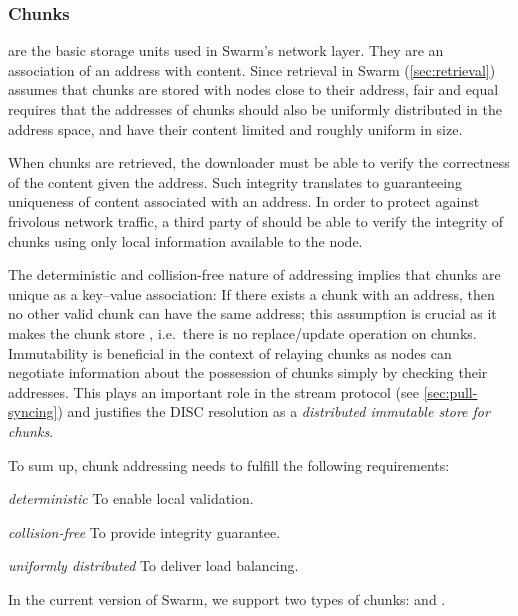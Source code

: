 \subsubsection{Chunks}\label{sec:chunks}

 are the basic storage units used in Swarm's network layer. They are an association of an address with content. Since retrieval in Swarm (\ref{sec:retrieval}) assumes that chunks are stored with nodes close to their address, fair and equal  requires that the addresses of chunks should also be uniformly distributed in the address space, and have their content limited and roughly uniform in size.  

When chunks are retrieved, the downloader must be able to verify the correctness of the content given the address. Such integrity translates to guaranteeing uniqueness of content associated with an address. In order to protect against frivolous network traffic, a third party of  should be able to verify the integrity of chunks using only local information available to the node.

The deterministic and collision-free nature of addressing implies that chunks are unique as a key--value association: If there exists a chunk with an address, then no other valid chunk can have the same address; this assumption is crucial as it makes the chunk store , i.e.\ there is no replace/update operation on chunks. Immutability is beneficial in the context of relaying chunks as nodes can negotiate information about the possession of chunks simply by checking their addresses. This plays an important role in the stream protocol (see \ref{sec:pull-syncing}) and justifies the DISC resolution as a \emph{distributed immutable store for chunks}.

To sum up, chunk addressing needs to fulfill the following requirements:

\begin{labelledlist}
    \item[\emph{deterministic}] To enable local validation.
    \item[\emph{collision-free}] To provide integrity guarantee.
    \item[\emph{uniformly distributed}] To deliver load balancing.
\end{labelledlist}

In the current version of Swarm, we support two types of chunks:  and . 

